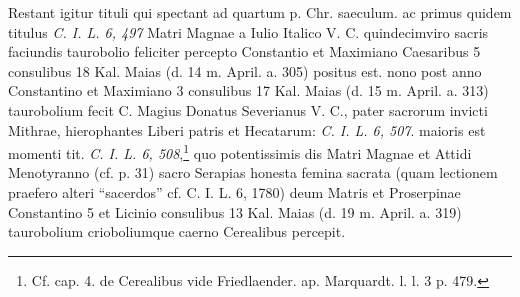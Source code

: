 \documentclass[a4paper, 11pt, oneside, polutonikogreek, german]{article}
\begin{document}
Restant igitur tituli qui spectant ad quartum p. Chr. saeculum. ac primus quidem titulus \emph{C. I. L. 6, 497} Matri Magnae a Iulio Italico V. C. quindecimviro sacris faciundis taurobolio feliciter percepto Constantio et Maximiano Caesaribus 5 consulibus 18 Kal. Maias (d. 14 m. April. a. 305) positus est. nono post anno Constantino et Maximiano 3 consulibus 17 Kal. Maias (d. 15 m. April. a. 313) taurobolium fecit C. Magius Donatus Severianus V. C., pater sacrorum invicti Mithrae, hierophantes Liberi patris et Hecatarum: \emph{C. I. L. 6, 507}. maioris est momenti tit. \emph{C. I. L. 6, 508},\footnote{Cf. cap. 4. de Cerealibus vide Friedlaender. ap. Marquardt. l. l. 3 p. 479.} quo potentissimis dis Matri Magnae et Attidi Menotyranno (cf. p. 31) sacro Serapias honesta femina sacrata (quam lectionem praefero alteri "`sacerdos"' cf. C. I. L. 6, 1780) deum Matris et Proserpinae Constantino 5 et Licinio consulibus 13 Kal. Maias (d. 19 m. April. a. 319) taurobolium crioboliumque caerno Cerealibus percepit.
\end{document}
